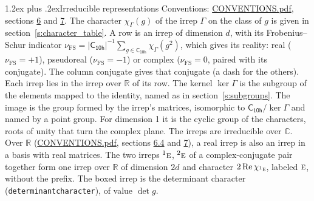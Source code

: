 \documentclass[10pt,a4paper]{article}
\makeatletter
\renewcommand\section{\@startsection{section}{1}{\z@}{-3ex plus -1ex minus -.2ex}%
  {1.2ex plus .2ex}{\normalfont\large\sffamily\bfseries\color{parttitle}}}
\numberwithin{equation}{section}
\newcommand{\grp}[1]{\mathsf{#1}}
\newcommand{\irr}[1]{\text{\normalfont\scshape #1}}
\newcommand{\conjpair}[1]{{}^{#1}}
\newcommand{\irchar}[1]{\chi_{#1}}
\newcommand{\fsind}{\nu_{\mathrm{FS}}}
\makeatother
\begin{document}
\section{Irreducible representations}\label{s:irreps}
Conventions: \href{../../CONVENTIONS.pdf}{CONVENTIONS.pdf}, sections \href{../../CONVENTIONS.pdf\#conv.6}{6} and \href{../../CONVENTIONS.pdf\#conv.7}{7}.
\leavevmode\label{n:function.character}\label{n:irrep.Gamma}The character $\irchar{\Gamma}(g)$ of the irrep $\Gamma$ on the class of $g$ is given in section~\ref{s:character_table}.
\leavevmode\label{n:index.dimension}\label{n:index.frobenius}\label{n:head.irrep}\label{n:head.reality}A row is an irrep of dimension $d$, with its Frobenius--Schur indicator $\fsind = |\grp{C_{10h}}|^{-1}\allowbreak\sum_{g\in\grp{C_{10h}}}\irchar{\Gamma}(g^2)$, which gives its reality: real ($\fsind = +1$), pseudoreal ($\fsind = -1$) or complex ($\fsind = 0$, paired with its conjugate). \label{n:head.conjugate}The column conjugate gives that conjugate (a dash for the others). \label{n:head.over.real}Each irrep lies in the irrep over $\mathbb{R}$ of its row. \label{n:head.kernel}The kernel $\ker\Gamma$ is the subgroup of the elements mapped to the identity, named as in section~\ref{s:subgroups}. \label{n:head.image}The image is the group formed by the irrep's matrices, isomorphic to $\grp{C_{10h}}/\ker\Gamma$ and named by a point group. For dimension 1 it is the cyclic group of the characters, roots of unity that turn the complex plane. The irreps are irreducible over $\mathbb{C}$. Over $\mathbb{R}$ (\href{../../CONVENTIONS.pdf}{CONVENTIONS.pdf}, sections \href{../../CONVENTIONS.pdf\#conv.6.4}{6.4} and \href{../../CONVENTIONS.pdf\#conv.7}{7}), a real irrep is also an irrep in a basis with real matrices. The two irreps $\conjpair{1}\irr{e}$, $\conjpair{2}\irr{e}$ of a complex-conjugate pair together form one irrep over $\mathbb{R}$ of dimension $2d$ and character $2\operatorname{Re}\irchar{\conjpair{1}\irr{e}}$, labeled $\irr{e}$, without the prefix. \label{n:mark.determinant}The boxed irrep is the determinant character (\texttt{determinantcharacter}), of value $\det g$.
\setlength{\emergencystretch}{2em}\par\setlength{\emergencystretch}{0pt}
\end{document}
